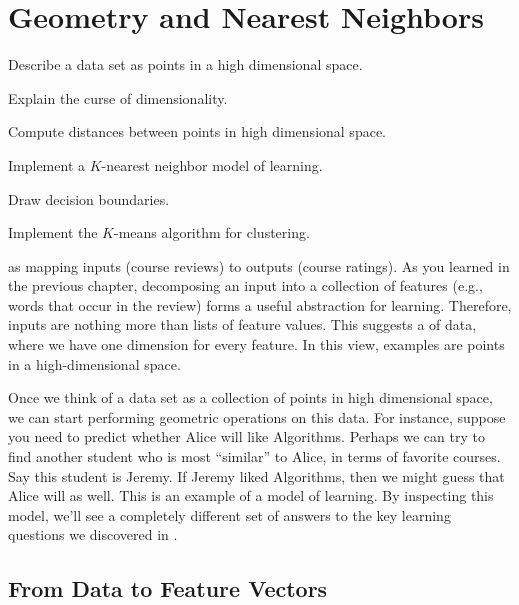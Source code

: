 \chapter{Geometry and Nearest Neighbors} \label{sec:knn}



\begin{learningobjectives}
\item Describe a data set as points in a high dimensional space.
\item Explain the curse of dimensionality.
\item Compute distances between points in high dimensional space.
\item Implement a $K$-nearest neighbor model of learning.
\item Draw decision boundaries.
\item Implement the $K$-means algorithm for clustering.
\end{learningobjectives}


 as mapping inputs
(course reviews) to outputs (course ratings).  As you learned in the
previous chapter, decomposing an input into a collection of features
(e.g., words that occur in the review) forms a useful abstraction for
learning.  Therefore, inputs are nothing more than lists of feature
values.  This suggests a  of data, where we
have one dimension for every feature.  In this view, examples are
points in a high-dimensional space.

Once we think of a data set as a collection of points in high
dimensional space, we can start performing geometric operations on
this data.  For instance, suppose you need to predict whether Alice
will like Algorithms.  Perhaps we can try to find another student who
is most ``similar'' to Alice, in terms of favorite courses.  Say this
student is Jeremy.  If Jeremy liked Algorithms, then we might guess
that Alice will as well.  This is an example of a  model of learning.  By inspecting this model, we'll see a
completely different set of answers to the key learning questions we
discovered in .

\section{From Data to Feature Vectors}

